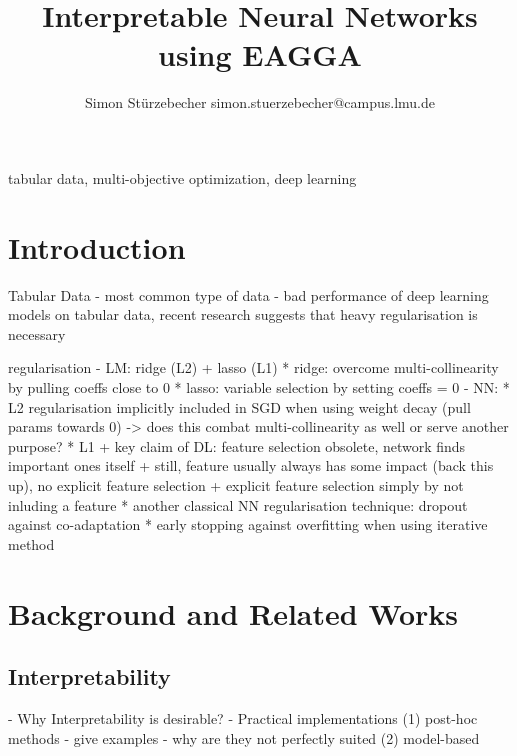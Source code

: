 \documentclass[twoside,11pt]{article}
\begin{document}
\title{Interpretable Neural Networks using EAGGA}

\author{\name Simon Stürzebecher \email simon.stuerzebecher@campus.lmu.de}


\maketitle

\begin{abstract}%
\end{abstract}

\begin{keywords}
  tabular data, multi-objective optimization, deep learning
\end{keywords}

\section{Introduction}
Tabular Data
- most common type of data
- bad performance of deep learning models on tabular data, recent research suggests that heavy regularisation is necessary

regularisation
- LM: ridge (L2) + lasso (L1)
  * ridge: overcome multi-collinearity by pulling coeffs close to 0
  * lasso: variable selection by setting coeffs = 0
- NN:
  * L2 regularisation implicitly included in SGD when using weight decay (pull params towards 0) -> does this combat multi-collinearity as well or serve another purpose?
  * L1
    + key claim of DL: feature selection obsolete, network finds important ones itself
    + still, feature usually always has some impact (back this up), no explicit feature selection
    + explicit feature selection simply by not inluding a feature
  * another classical NN regularisation technique: dropout against co-adaptation
  * early stopping against overfitting when using iterative method



\section{Background and Related Works}

\subsection{Interpretability}
- Why Interpretability is desirable?
- Practical implementations
  (1) post-hoc methods
    - give examples
    - why are they not perfectly suited
  (2) model-based
\end{document}
